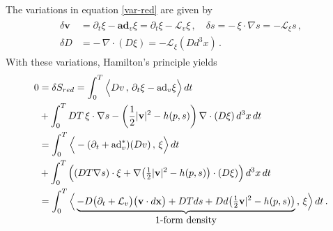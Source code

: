 \documentclass[11pt, oneside]{article}   	%
\numberwithin{equation}{section}
\theoremstyle{plain}
\theoremstyle{definition}
\theoremstyle{remark}
\newcommand{\<}{\langle}
\renewcommand{\>}{\rangle}
\begin{document}
The variations in equation \eqref{var-red} are given by
\begin{align}
\begin{split}
\delta\mathbf{v} &= \partial_t\xi - \mathbf{ad}_v \xi = \partial_t\xi -  \mathcal{L}_v \xi
\,,\quad 
\delta s = - \,\xi\cdot \nabla s = -  \mathcal{L}_\xi s
\,,
\\
\delta D &= - \,\nabla \cdot (D\xi) = -  \mathcal{L}_\xi (Dd^3x)
\,.
\end{split}
\end{align}
With these variations, Hamilton's principle yields 
\begin{align*}
\begin{split}
0 &= \delta {S}_{red} = \int_0^T 
\Big\langle D{v} \,,\,\partial_t \xi - \mathrm{ad}_v \xi\Big\rangle\,dt 
\\&+  \int_0^T DT\,\xi \cdot \nabla s - \left(\frac{1}{2}
|\mathbf{v}|^2 - h(p,s)\right)\nabla \cdot (D\xi) \,d^3x\,dt
\\&= \int_0^T  \Big\langle -(\partial_t + \mathrm{ad}^*_v )(D{v} )\,,\,\xi \Big\rangle \,dt 
\\&+  \int_0^T \Big((DT\nabla s) \cdot \xi + \nabla\big(\tfrac{1}{2}
|\mathbf{v}|^2 - h(p,s)\big) \cdot (D\xi)\Big) \,d^3x\,dt
\\&= \int_0^T 
\Big\langle\underbrace{ - D\big(\partial_t +  \mathcal{L}_{v}\big)
\big({\mathbf{v}}\cdot d\mathbf{x}\big)
+ D Tds + Dd\big(\tfrac{1}{2} \mathbf{v}|^2 - h(p,s)\big)}_{\hbox{1-form density}}\,,\, \xi\Big\rangle \,dt \,.
\end{split}
\label{EPvar-Ham}
\end{align*}
\end{document}
